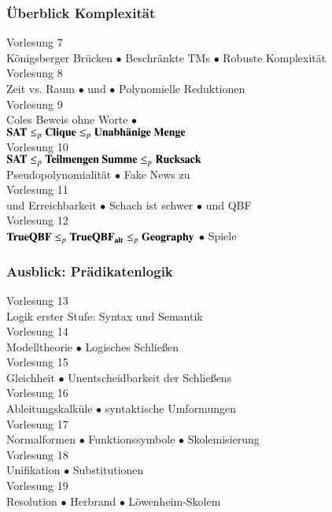 \documentclass[aspectratio=1610,onlymath]{beamer}
\begin{document}
\begin{frame}\frametitle{Überblick Komplexität}

\begin{center}
\alert{Vorlesung 7}\\
Königsberger Brücken $\bullet$ Beschränkte TMs $\bullet$ Robuste Komplexität\\[1ex]
\alert{Vorlesung 8}\\
Zeit vs. Raum $\bullet$  und   $\bullet$ Polynomielle Reduktionen \\[1ex]
\alert{Vorlesung 9}\\
Coles Beweis ohne Worte $\bullet$ \\$\textbf{\textcolor{black}{SAT}}\leq_p \textbf{\textcolor{black}{Clique}}\leq_p \textbf{\textcolor{black}{Unabhänige Menge}}$ \\[1ex]
\alert{Vorlesung 10}\\
$\textbf{\textcolor{black}{SAT}}\leq_p \textbf{\textcolor{black}{Teilmengen Summe}}\leq_p \textbf{\textcolor{black}{Rucksack}}$ \\Pseudopolynomialität $\bullet$ Fake News zu  \\[1ex]
\alert{Vorlesung 11}\\
 und Erreichbarkeit $\bullet$ Schach ist schwer $\bullet$ \PSpace und QBF \\[1ex]
\alert{Vorlesung 12}\\
$\textbf{\textcolor{black}{TrueQBF}}\leq_p \textbf{\textcolor{black}{TrueQBF}}_{\textbf{\textcolor{black}{alt}}}\leq_p \textbf{\textcolor{black}{Geography}}$ $\bullet$ Spiele 
\end{center}

\end{frame}

\begin{frame}\frametitle{Ausblick: Prädikatenlogik}

\begin{center}
\alert{Vorlesung 13}\\
Logik erster Stufe: Syntax und Semantik\\[1ex]
\alert{Vorlesung 14}\\
Modelltheorie $\bullet$ Logisches Schließen\\[1ex]
\alert{Vorlesung 15}\\
Gleichheit $\bullet$ Unentscheidbarkeit der Schließens \\[1ex]
\alert{Vorlesung 16}\\
Ableitungskalküle $\bullet$ syntaktische Umformungen \\[1ex]
\alert{Vorlesung 17}\\
Normalformen $\bullet$ Funktionssymbole $\bullet$ Skolemisierung\\[1ex]
\alert{Vorlesung 18}\\
Unifikation $\bullet$ Substitutionen \\[1ex]
\alert{Vorlesung 19}\\
Resolution $\bullet$ Herbrand $\bullet$ Löwenheim-Skolem

\end{center}

\end{frame}
\end{document}
